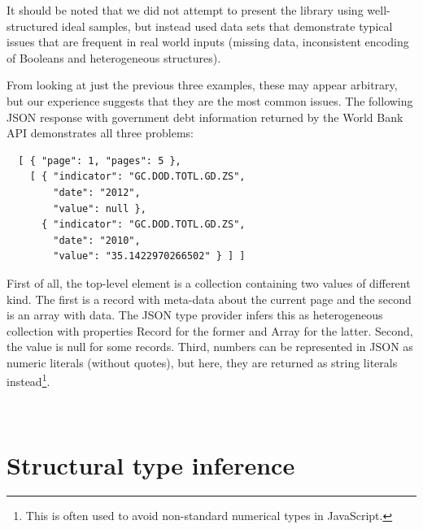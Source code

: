 \documentclass[10pt,preprint,clearpagebib]{sigplanconf}
\newcommand{\kvd}[1]{\textnormal{\textcolor{kvdclr}{\sffamily #1}}}
\newcommand{\ident}[1]{\textnormal{\sffamily #1}}
\begin{document}
It should be noted that we did not attempt to present the library using well-structured ideal 
samples, but instead used data sets that demonstrate typical issues that are frequent in real 
world inputs (missing data, inconsistent encoding of Booleans and heterogeneous structures).

From looking at just the previous three examples, these may appear arbitrary, but our experience
suggests that they are the most common issues. The following JSON response with government debt
information returned by the World Bank API demonstrates all three problems:
%
{\small{
\begin{verbatim}
  [ { "page": 1, "pages": 5 },
    [ { "indicator": "GC.DOD.TOTL.GD.ZS",
        "date": "2012",
        "value": null },
      { "indicator": "GC.DOD.TOTL.GD.ZS",
        "date": "2010",
        "value": "35.1422970266502" } ] ]
\end{verbatim}
}}
%
\noindent
First of all, the top-level element is a collection containing two values of different kind.
The first is a record with meta-data about the current page and the second is an array with data. 
The JSON type provider infers this as heterogeneous collection with properties \ident{Record}
for the former and \ident{Array} for the latter. Second, the \ident{value} is \kvd{null} for some
records. Third, numbers can be represented in JSON as numeric literals (without quotes), but
here, they are returned as string literals instead\footnote{This is often used to avoid non-standard
numerical types in JavaScript.}.




%
%

\newpage
~
\newpage
\section{Structural type inference}
\label{sec:inference}
\end{document}
